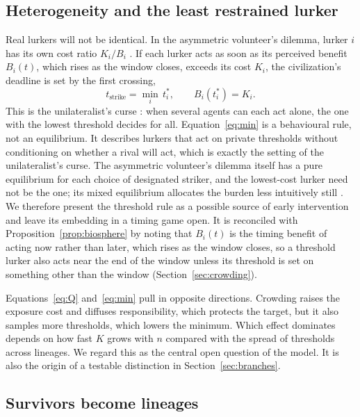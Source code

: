 \documentclass[preprint,12pt]{elsarticle}
\theoremstyle{definition}
\begin{document}
\subsection{Heterogeneity and the least restrained lurker}
\label{sec:hetero}

Real lurkers will not be identical. In the asymmetric volunteer's dilemma, lurker $i$ has its own cost ratio $K_i/B_i$ \citep{Diekmann1993}. If each lurker acts as soon as its perceived benefit $B_i(t)$, which rises as the window closes, exceeds its cost $K_i$, the civilization's deadline is set by the first crossing,
\begin{equation}
t_{\text{strike}} = \min_{i} \, t_i^{*}, \qquad B_i(t_i^{*}) = K_i .
\label{eq:min}
\end{equation}
This is the unilateralist's curse \citep{Bostrom2016}: when several agents can each act alone, the one with the lowest threshold decides for all. Equation~\eqref{eq:min} is a behavioural rule, not an equilibrium. It describes lurkers that act on private thresholds without conditioning on whether a rival will act, which is exactly the setting of the unilateralist's curse. The asymmetric volunteer's dilemma itself has a pure equilibrium for each choice of designated striker, and the lowest-cost lurker need not be the one; its mixed equilibrium allocates the burden less intuitively still \citep{Diekmann1993}. We therefore present the threshold rule as a possible source of early intervention and leave its embedding in a timing game open. It is reconciled with Proposition~\ref{prop:biosphere} by noting that $B_i(t)$ is the timing benefit of acting now rather than later, which rises as the window closes, so a threshold lurker also acts near the end of the window unless its threshold is set on something other than the window (Section~\ref{sec:crowding}).

Equations~\eqref{eq:Q} and~\eqref{eq:min} pull in opposite directions. Crowding raises the exposure cost and diffuses responsibility, which protects the target, but it also samples more thresholds, which lowers the minimum. Which effect dominates depends on how fast $K$ grows with $n$ compared with the spread of thresholds across lineages. We regard this as the central open question of the model. It is also the origin of a testable distinction in Section~\ref{sec:branches}.

\subsection{Survivors become lineages}
\label{sec:survivors}
\end{document}
